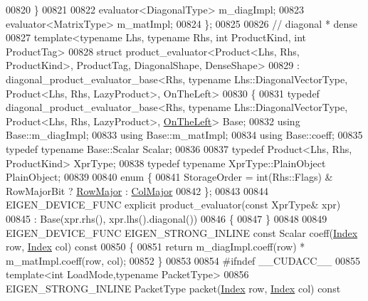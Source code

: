 \begin{DoxyCode}
00820   \}
00821   
00822   evaluator<DiagonalType> m\_diagImpl;
00823   evaluator<MatrixType>   m\_matImpl;
00824 \};
00825 
00826 \textcolor{comment}{// diagonal * dense}
00827 \textcolor{keyword}{template}<\textcolor{keyword}{typename} Lhs, \textcolor{keyword}{typename} Rhs, \textcolor{keywordtype}{int} ProductKind, \textcolor{keywordtype}{int} ProductTag>
00828 \textcolor{keyword}{struct }product\_evaluator<Product<Lhs, Rhs, ProductKind>, ProductTag, DiagonalShape, DenseShape>
00829   : diagonal\_product\_evaluator\_base<Rhs, typename Lhs::DiagonalVectorType, Product<Lhs, Rhs, LazyProduct>, 
      OnTheLeft>
00830 \{
00831   \textcolor{keyword}{typedef} diagonal\_product\_evaluator\_base<Rhs, typename Lhs::DiagonalVectorType, Product<Lhs, Rhs,
       LazyProduct>, \hyperlink{group__enums_ggac22de43beeac7a78b384f99bed5cee0ba129609b3bdf23b071f5f86cf2f995ec4}{OnTheLeft}> Base;
00832   \textcolor{keyword}{using} Base::m\_diagImpl;
00833   \textcolor{keyword}{using} Base::m\_matImpl;
00834   \textcolor{keyword}{using} Base::coeff;
00835   \textcolor{keyword}{typedef} \textcolor{keyword}{typename} Base::Scalar Scalar;
00836   
00837   \textcolor{keyword}{typedef} Product<Lhs, Rhs, ProductKind> XprType;
00838   \textcolor{keyword}{typedef} \textcolor{keyword}{typename} XprType::PlainObject PlainObject;
00839   
00840   \textcolor{keyword}{enum} \{
00841     StorageOrder = int(Rhs::Flags) & RowMajorBit ? \hyperlink{group__enums_ggaacded1a18ae58b0f554751f6cdf9eb13acfcde9cd8677c5f7caf6bd603666aae3}{RowMajor} : \hyperlink{group__enums_ggaacded1a18ae58b0f554751f6cdf9eb13a0cbd4bdd0abcfc0224c5fcb5e4f6669a}{ColMajor}
00842   \};
00843 
00844   EIGEN\_DEVICE\_FUNC \textcolor{keyword}{explicit} product\_evaluator(\textcolor{keyword}{const} XprType& xpr)
00845     : Base(xpr.rhs(), xpr.lhs().diagonal())
00846   \{
00847   \}
00848   
00849   EIGEN\_DEVICE\_FUNC EIGEN\_STRONG\_INLINE \textcolor{keyword}{const} Scalar coeff(\hyperlink{namespace_eigen_a62e77e0933482dafde8fe197d9a2cfde}{Index} row, \hyperlink{namespace_eigen_a62e77e0933482dafde8fe197d9a2cfde}{Index} col)\textcolor{keyword}{ const}
00850 \textcolor{keyword}{  }\{
00851     \textcolor{keywordflow}{return} m\_diagImpl.coeff(row) * m\_matImpl.coeff(row, col);
00852   \}
00853   
00854 \textcolor{preprocessor}{#ifndef \_\_CUDACC\_\_}
00855   \textcolor{keyword}{template}<\textcolor{keywordtype}{int} LoadMode,\textcolor{keyword}{typename} PacketType>
00856   EIGEN\_STRONG\_INLINE PacketType packet(\hyperlink{namespace_eigen_a62e77e0933482dafde8fe197d9a2cfde}{Index} row, \hyperlink{namespace_eigen_a62e77e0933482dafde8fe197d9a2cfde}{Index} col)\textcolor{keyword}{ const}

\end{DoxyCode}
